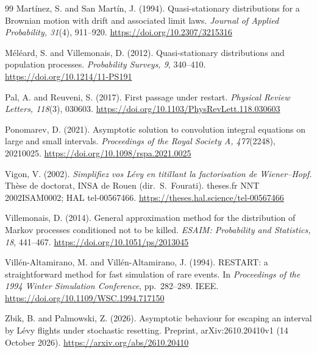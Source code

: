 \documentclass[11pt,a4paper]{article}
\theoremstyle{definition}
\theoremstyle{remark}
\newcommand{\1}{\mathbf 1}
\begin{document}
\begin{thebibliography}{99}
Mart\'inez, S. and San Mart\'in, J. (1994). Quasi-stationary distributions for a Brownian motion with drift and associated limit laws. \emph{Journal of Applied Probability, 31}(4), 911--920. \url{https://doi.org/10.2307/3215316}

M\'el\'eard, S. and Villemonais, D. (2012). Quasi-stationary distributions and population processes. \emph{Probability Surveys, 9}, 340--410. \url{https://doi.org/10.1214/11-PS191}

Pal, A. and Reuveni, S. (2017). First passage under restart. \emph{Physical Review Letters, 118}(3), 030603. \url{https://doi.org/10.1103/PhysRevLett.118.030603}

Ponomarev, D. (2021). Asymptotic solution to convolution integral equations on large and small intervals. \emph{Proceedings of the Royal Society A, 477}(2248), 20210025. \url{https://doi.org/10.1098/rspa.2021.0025}

Vigon, V. (2002). \emph{Simplifiez vos L\'evy en titillant la factorisation de Wiener--Hopf}. Th\`ese de doctorat, INSA de Rouen (dir.\ S.~Fourati). theses.fr NNT 2002ISAM0002; HAL tel-00567466. \url{https://theses.hal.science/tel-00567466}

Villemonais, D. (2014). General approximation method for the distribution of Markov processes conditioned not to be killed. \emph{ESAIM: Probability and Statistics, 18}, 441--467. \url{https://doi.org/10.1051/ps/2013045}

Vill\'en-Altamirano, M. and Vill\'en-Altamirano, J. (1994). RESTART: a straightforward method for fast simulation of rare events. In \emph{Proceedings of the 1994 Winter Simulation Conference}, pp.~282--289. IEEE. \url{https://doi.org/10.1109/WSC.1994.717150}

Zbik, B. and Palmowski, Z. (2026). Asymptotic behaviour for escaping an interval by L\'evy flights under stochastic resetting. Preprint, arXiv:2610.20410v1 (14 October 2026). \url{https://arxiv.org/abs/2610.20410}

\end{thebibliography}
\end{document}
